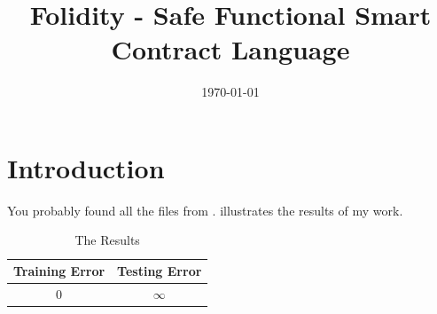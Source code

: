 \documentclass{ecsproject}     %
\begin{document}
\frontmatter
\title      {Folidity - Safe Functional Smart Contract Language}
\addresses  {\groupname\\\deptname\\\univname}
\date       {\today}
\subject    {}
\keywords   {}
\maketitle
\tableofcontents
\mainmatter

\chapter{Introduction} \label{Chapter:Introduction}
You probably found all the files from \cite{test_this_nodate}.
 illustrates the results of my work.
\begin{table}[!htb]
  \centering
  \begin{tabular}{cc}
  \toprule
  \textbf{Training Error} & \textbf{Testing Error}\\
  \midrule
  0 & $\infty$\\
  \bottomrule
  \end{tabular}
  \caption{The Results}
  \label{Table:tabex}
\end{table}
\end{document}
